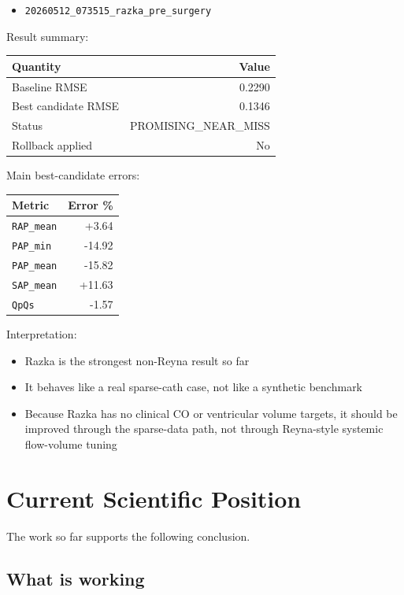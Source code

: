 \documentclass[11pt,a4paper]{article}
\begin{document}
\begin{itemize}[leftmargin=1.5em]
    \item \texttt{20260512\_073515\_razka\_pre\_surgery}
\end{itemize}

Result summary:

\begin{tabular}{lr}
\toprule
Quantity & Value \\
\midrule
Baseline RMSE & 0.2290 \\
Best candidate RMSE & 0.1346 \\
Status & PROMISING\_NEAR\_MISS \\
Rollback applied & No \\
\bottomrule
\end{tabular}

Main best-candidate errors:

\begin{tabular}{lr}
\toprule
Metric & Error \% \\
\midrule
\texttt{RAP\_mean} & +3.64 \\
\texttt{PAP\_min} & -14.92 \\
\texttt{PAP\_mean} & -15.82 \\
\texttt{SAP\_mean} & +11.63 \\
\texttt{QpQs} & -1.57 \\
\bottomrule
\end{tabular}

Interpretation:

\begin{itemize}[leftmargin=1.5em]
    \item Razka is the strongest non-Reyna result so far
    \item It behaves like a real sparse-cath case, not like a synthetic benchmark
    \item Because Razka has no clinical CO or ventricular volume targets, it
    should be improved through the sparse-data path, not through Reyna-style
    systemic flow-volume tuning
\end{itemize}

\section{Current Scientific Position}

The work so far supports the following conclusion.

\subsection{What is working}
\end{document}
